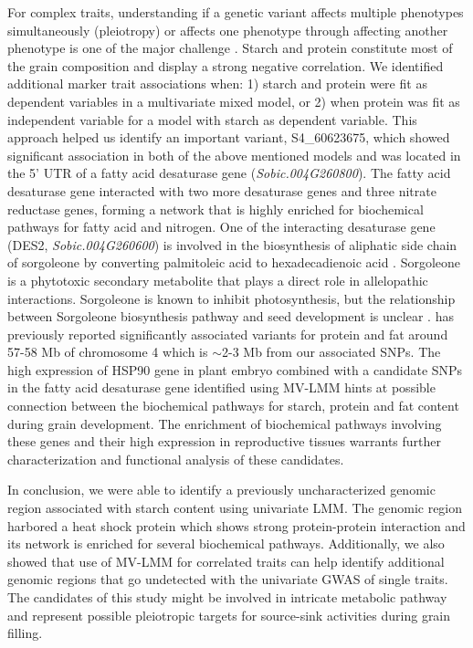 \documentclass[10pt,letterpaper]{article}
\begin{document}
For complex traits, understanding if a genetic variant affects multiple phenotypes simultaneously (pleiotropy) or affects one phenotype through affecting another phenotype is one of the major challenge \parencite{yang2012methods}. Starch and protein constitute most of the grain composition and display a strong negative correlation. We identified additional marker trait associations when: 1) starch and protein were fit as dependent variables in a multivariate mixed model, or 2) when protein was fit as independent variable for a model with starch as dependent variable. This approach helped us identify an important variant, S4\_60623675, which showed significant association in both of the above mentioned models and was located in the 5' UTR of a fatty acid desaturase gene (\textit{Sobic.004G260800}). The fatty acid desaturase gene interacted with two more desaturase genes and three nitrate reductase genes, forming a network that is highly enriched for biochemical pathways for fatty acid and nitrogen. One of the interacting desaturase gene (DES2, \textit{Sobic.004G260600}) is involved in the biosynthesis of aliphatic side chain of sorgoleone by converting palmitoleic acid to hexadecadienoic acid \parencite{pan2007functional}. Sorgoleone is a phytotoxic secondary metabolite that plays a direct role in allelopathic interactions. Sorgoleone is known to inhibit photosynthesis, but the relationship between Sorgoleone biosynthesis pathway and seed development is unclear  \parencite{einhellig1993effects}. \citet{rhodes2017genetic} has previously reported significantly associated variants for protein and fat around 57-58 Mb of chromosome 4 which is $\sim$2-3 Mb from our associated SNPs. The high expression of HSP90 gene in plant embryo combined with a candidate SNPs in the fatty acid desaturase gene identified using MV-LMM hints at possible connection between the biochemical pathways for starch, protein and fat content during grain development. The enrichment of biochemical pathways involving these genes and their high expression in reproductive tissues warrants further characterization and functional analysis of these candidates.

In conclusion, we were able to identify a previously uncharacterized genomic region associated with starch content using univariate LMM. The genomic region harbored a heat shock protein which shows strong protein-protein interaction and its network is enriched for several biochemical pathways. Additionally, we also showed that use of MV-LMM for correlated traits can help identify additional genomic regions that go undetected with the univariate GWAS of single traits. The candidates of this study might be involved in intricate metabolic pathway and represent possible pleiotropic targets for source-sink activities during grain filling.
\end{document}
